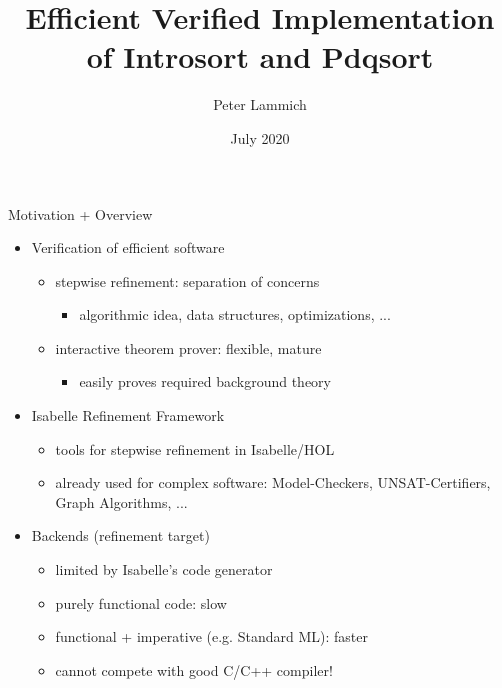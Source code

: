 \documentclass[fleqn]{beamer}
\title{Efficient Verified Implementation of Introsort and Pdqsort}
\author[Peter Lammich]{Peter Lammich}
\institute[UoM] %
{ The University of Manchester}
\date {July 2020}
\begin{document}
% 

\begin{frame}
  \titlepage
\end{frame}


\newcommand{\insertsectitle}{}

\setbeamertemplate{frametitle}{\vspace{.7em}\insertframetitle\hfill \small\raisebox{10pt}{\insertsectitle}}

\begin{frame}{Motivation + Overview}
  \begin{itemize}
   \item<+-> Verification of efficient software
    \begin{itemize}
     \item stepwise refinement: separation of concerns
      \begin{itemize}
       \item algorithmic idea, data structures, optimizations, ...
      \end{itemize}
     \item interactive theorem prover: flexible, mature
      \begin{itemize}
       \item easily proves required background theory
      \end{itemize}
    \end{itemize}
   \item<+-> Isabelle Refinement Framework
    \begin{itemize}
     \item tools for stepwise refinement in Isabelle/HOL
     \item already used for complex software: Model-Checkers, UNSAT-Certifiers, Graph Algorithms, ...
    \end{itemize}
   \item<+-> Backends (refinement target)
    \begin{itemize}
     \item limited by Isabelle's code generator
     \item purely functional code: {\color{red}slow}
     \item functional + imperative (e.g. Standard ML): {\color{orange}faster}
     \item<+-> cannot compete with good C/C++ compiler!

    \end{itemize}
  \end{itemize}
\end{frame}
\end{document}
